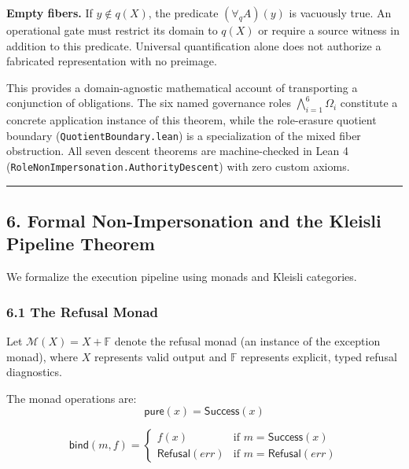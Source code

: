 \documentclass[
  10pt,
]{article}
\begin{document}
\textbf{Empty fibers.} If \hypertarget{math-E0096-0124}{}{\(y\notin q(X)\)}, the predicate \hypertarget{math-E0097-0125}{}{\((\forall_q A)(y)\)} is vacuously true. An operational gate must restrict its domain to \hypertarget{math-E0098-0126}{}{\(q(X)\)} or require a source witness in addition to this predicate. Universal quantification alone does not authorize a fabricated representation with no preimage.

This provides a domain-agnostic mathematical account of transporting a conjunction of obligations. The six named governance roles \hypertarget{math-E0099-0127}{}{\(\bigwedge_{i=1}^6 \Omega_i\)} constitute a concrete application instance of this theorem, while the role-erasure quotient boundary (\texttt{QuotientBoundary.lean}) is a specialization of the mixed fiber obstruction. All seven descent theorems are machine-checked in Lean 4 (\texttt{RoleNonImpersonation.AuthorityDescent}) with zero custom axioms.

\begin{center}\rule{0.5\linewidth}{0.5pt}\end{center}

\subsection{6. Formal Non-Impersonation and the Kleisli Pipeline Theorem}\label{formal-non-impersonation-and-the-kleisli-pipeline-theorem}

We formalize the execution pipeline using monads and Kleisli categories.

\subsubsection{6.1 The Refusal Monad}\label{the-refusal-monad}

Let \hypertarget{math-E0008-0128}{}{\(\mathcal{M}(X) = X + \mathbb{F}\)} denote the refusal monad (an instance of the exception monad), where \hypertarget{math-E0100-0129}{}{\(X\)} represents valid output and \hypertarget{math-E0009-0130}{}{\(\mathbb{F}\)} represents explicit, typed refusal diagnostics.

The monad operations are: \hypertarget{math-E0101-0131}{}{\[\mathsf{pure}(x) = \mathsf{Success}(x)\]}

\hypertarget{math-E0102-0132}{}{\[\mathsf{bind}(m, f) = \begin{cases}
f(x) & \text{if } m = \mathsf{Success}(x) \\
\mathsf{Refusal}(err) & \text{if } m = \mathsf{Refusal}(err)
\end{cases}\]}
\end{document}

